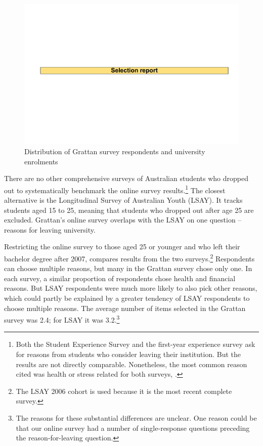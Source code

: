                 \begin{figure}
                    \caption{Distribution of Grattan survey respondents and university enrolments\label{fig:25}}%
                    \includegraphics[page=38]{atlas/selection_chartdeck.pdf} 
                \end{figure}


There are no other comprehensive surveys of Australian students who dropped out to systematically benchmark the online survey results.\footnote{Both the Student Experience Survey and the first-year experience survey ask for reasons from students who consider leaving their institution. But the results are not directly comparable. Nonetheless, the most common reason cited was health or stress related for both surveys, \textcites[][29]{Baik2015}[][74]{SocialResearchCentre/DepartmentofEducationandTraining2017}.} The closest alternative is the Longitudinal Survey of Australian Youth (LSAY). It tracks students aged 15 to 25, meaning that students who dropped out after age 25 are excluded. Grattan's online survey overlaps with the LSAY on one question -- reasons for leaving university.

Restricting the online survey to those aged 25 or younger and who left their bachelor degree after 2007,  compares results from the two surveys.\footnote{The LSAY 2006 cohort is used because it is the most recent complete survey.} 
Respondents can choose multiple reasons, but many in the Grattan survey chose only one. In each survey, a similar proportion of respondents chose health and financial reasons. But LSAY respondents were much more likely to also pick other reasons, which could partly be explained by a greater tendency of LSAY respondents to choose multiple reasons. The average number of items selected in the Grattan survey was 2.4; for LSAY it was 3.2.\footnote{The reasons for these substantial differences are unclear. One reason could be that our online survey had a number of single-response questions preceding the reason-for-leaving question.}

